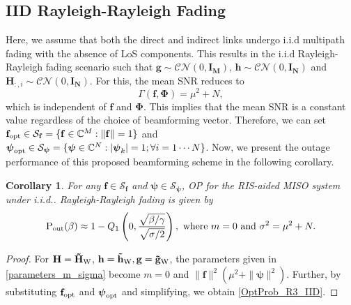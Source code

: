 \documentclass[journal,draftclsnofoot,onecolumn,12pt]{IEEEtran}
\newtheorem{corollary}{Corollary}[theorem]
\begin{document}
\subsection{IID Rayleigh-Rayleigh Fading}\label{R3_IID}
Here, we assume that  both the direct and indirect links undergo {\rm i.i.d} multipath fading with the absence of LoS components. This results in the {\rm i.i.d} Rayleigh-Rayleigh fading scenario such that 
$\mathbf{g}\sim\mathcal{C}\mathcal{N}(0,\mathbf{I_M})$, $\mathbf{h}\sim\mathcal{C}\mathcal{N}(0,\mathbf{I_N})$ and $\mathbf{H}_{:,i}\sim\mathcal{C}\mathcal{N}(0,\mathbf{I_N})$. For this, the mean {\rm SNR} reduces to
\vspace{-0.3cm}
\begin{equation}
  \Gamma(\mathbf{f},\mathbf{\Phi})=  \mu^2 + N\label{OptProb_R3_IID},
\end{equation}
which is independent of  $\mathbf{f}$ and $\mathbf{\Phi}$. This implies that the mean {\rm SNR}  is a constant value regardless of the choice of beamforming vector. Therefore, we can set $\mathbf{f}_{\rm opt} \in \mathcal{S}_\mathbf{f} = \{ \mathbf{f} \in \mathbb{C}^M : \|\mathbf{f}\| = 1 \}$ and $\boldsymbol{\psi}_{\rm opt} \in \mathcal{S}_{\boldsymbol{\psi}}  = \{ \boldsymbol{\psi} \in \mathbb{C}^N : |\boldsymbol{\psi}_k| = 1 ; \forall i = 1 \cdots N\}$.
Now, we present the outage performance of this proposed beamforming scheme in  the following corollary. 
\setcounter{theorem}{5}
\setcounter{corollary}{0}
\vspace{-0.3cm}
\begin{corollary}\label{cor:outage_R3IID}
For any $\mathbf{f}\in\mathcal{S}_\mathbf{f}$ and $\boldsymbol{\psi}\in\mathcal{S}_\mathbf{\boldsymbol{\psi}}$, OP for the RIS-aided MISO system under {\rm i.i.d.}. Rayleigh-Rayleigh fading is given by
\begin{align}
    {\rm P_{out}}(\beta) \approx 1-Q_1\left(0,\frac{\sqrt{\beta/\gamma}}{\sqrt{\sigma/2}}\right), \text{~where~}  m =  0 \text{~and~} \sigma^2=\mu^2 + N.\label{Pout_R3_IID}
\end{align}
\end{corollary}
\vspace{-0.3cm}
\begin{proof}
For $\mathbf{{H}} = \mathbf{\Tilde{H}}_{\rm W}$, $\mathbf{h} = \mathbf{\Tilde{h}}_{\rm W}, \mathbf{g} = \mathbf{\Tilde{g}}_{\rm W}$, the parameters given in \eqref{parameters_m_sigma} become $m = 0$ and $\|\mathbf{f}\|^2\left(\mu^2 + \|\boldsymbol{\psi}\|^2\right)$. Further, by substituting $\mathbf{f}_{\rm opt}$ and $\mathbf{\boldsymbol{\psi}_{\rm opt}}$ and simplifying, we obtain \eqref{OptProb_R3_IID}. 
\end{proof}
\end{document}

